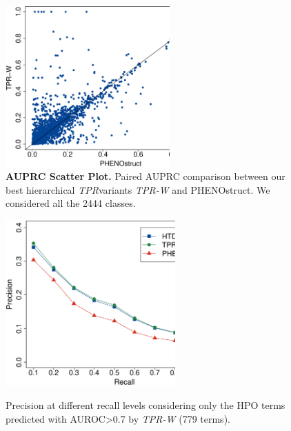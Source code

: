 \documentclass{bioinfo}
\newcommand{\tpr}{{\em TPR}}
\begin{document}
\begin{figure}[!hb]
\centering
\includegraphics[width = 6.3cm]{Fig_ExpII/ScatterPlot_Shrink_PRC_Nofilter.eps} 
\caption{{\bf AUPRC Scatter Plot.} Paired AUPRC comparison between our best hierarchical \tpr variants {\em TPR-W} and PHENOstruct. We considered all the 2444 classes.}
\label{pxrcurves-shrink3}
\end{figure}

\begin{figure}[!ht]
\centering
\includegraphics[width=6.5cm]{Fig_ExpII/PXR_curves_Shrink_TPRWfilter.eps} \\
\caption{Precision at different recall levels considering only the HPO terms predicted with AUROC>0.7 by {\em TPR-W} (779 terms).}
\label{fig:pxr-best}
\end{figure}
\end{document}

